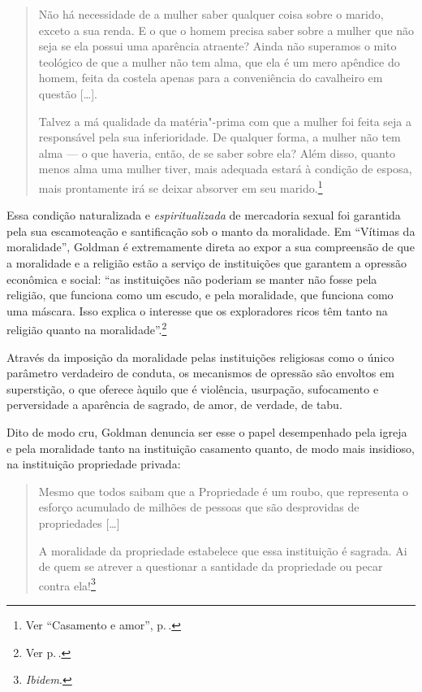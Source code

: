 \begin{quote}
Não há necessidade de a mulher saber
qualquer coisa sobre o marido, exceto a sua renda. E o que o homem
precisa saber sobre a mulher que não seja se ela possui uma aparência
atraente? Ainda não superamos o mito teológico de que a mulher não tem
alma, que ela é um mero apêndice do homem, feita da costela apenas para
a conveniência do cavalheiro em questão {[}\ldots{]}.

Talvez a má qualidade da matéria"-prima com que a mulher foi feita seja a
responsável pela sua inferioridade. De qualquer forma, a mulher não tem
alma --- o que haveria, então, de se saber sobre ela? Além disso, quanto
menos alma uma mulher tiver, mais adequada estará à condição de esposa,
mais prontamente irá se deixar absorver em seu marido.\footnote{Ver ``Casamento e amor'', p.\,\pageref{ref7}.}
\end{quote}

Essa condição naturalizada e \textit{espiritualizada} de mercadoria
sexual foi garantida pela sua escamoteação e santificação sob o manto
da moralidade. Em ``Vítimas da moralidade'', Goldman é extremamente
direta ao expor a sua compreensão de que a moralidade e a religião estão a
serviço de instituições que garantem a opressão econômica e social:
``as instituições não poderiam se manter não
fosse pela religião, que funciona como um escudo, e pela moralidade, que
funciona como uma máscara. Isso explica o interesse que os exploradores
ricos têm tanto na religião quanto na moralidade''.\footnote{Ver p.\,\pageref{ref8}.} 

Através da
imposição da moralidade pelas instituições religiosas como o único
parâmetro verdadeiro de conduta, os mecanismos de opressão são envoltos
em superstição, o que oferece àquilo que é violência,
usurpação, sufocamento e perversidade a aparência de sagrado, de amor, de
verdade, de tabu.

Dito de modo cru, Goldman denuncia ser esse o papel
desempenhado pela igreja e pela moralidade tanto na
instituição casamento quanto, de modo mais insidioso, na
instituição propriedade privada:

\begin{quote}
Mesmo que todos saibam que a
Propriedade é um roubo, que representa o esforço acumulado de milhões de
pessoas que são desprovidas de propriedades {[}\ldots{]}

A moralidade da propriedade estabelece que essa
instituição é sagrada. Ai de quem se atrever a questionar a santidade da
propriedade ou pecar contra ela!\footnote{\textit{Ibidem}.} 
\end{quote}

